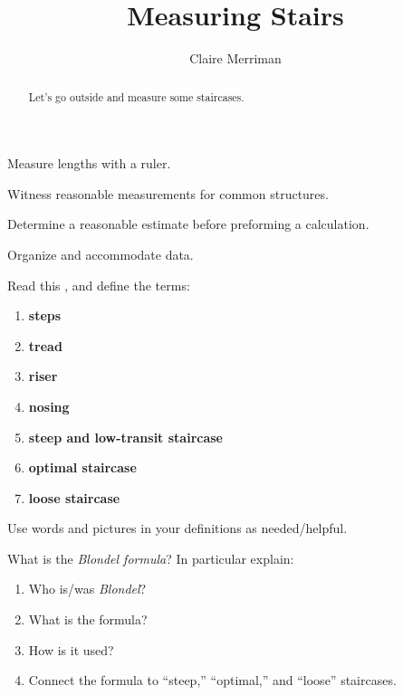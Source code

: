 \documentclass[handout,nooutcomes,noauthor,hints]{ximera}
\title{Measuring Stairs}
\author{Claire Merriman}
\begin{document}
\begin{abstract}
  Let's go outside and measure some staircases.
\end{abstract}
\maketitle


\begin{listOutcomes}
\item Measure lengths with a ruler.
\item Witness reasonable measurements for common structures.
\item Determine a reasonable estimate before preforming a calculation.
\item Organize and accommodate data.
\end{listOutcomes}





\begin{question}
Read this ,
and define the terms:
\begin{enumerate}
\item \textbf{steps}
\item \textbf{tread}
\item \textbf{riser}
\item \textbf{nosing}
\item \textbf{steep and low-transit staircase}
\item \textbf{optimal staircase}
\item \textbf{loose staircase}
\end{enumerate}
Use words and pictures in your definitions as needed/helpful.

\end{question}


\mynewpage

\begin{question}
  What is the \textit{Blondel formula}? In particular explain:
  \begin{enumerate}
  \item Who is/was \textit{Blondel}?
  \item What is the formula?
  \item How is it used?
  \item Connect the formula to ``steep,'' ``optimal,'' and ``loose''
    staircases.
  \end{enumerate}
\end{question}
\end{document}
